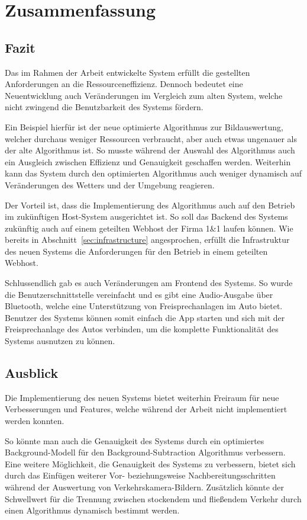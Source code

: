\chapter{Zusammenfassung}

\section{Fazit}
Das im Rahmen der Arbeit entwickelte System erfüllt die gestellten Anforderungen an die Ressourceneffizienz.
Dennoch bedeutet eine Neuentwicklung auch Veränderungen im Vergleich zum alten System, welche nicht zwingend die Benutzbarkeit des Systems fördern.

Ein Beispiel hierfür ist der neue optimierte Algorithmus zur Bildauswertung, welcher durchaus weniger Ressourcen verbraucht, aber auch etwas ungenauer als der alte Algorithmus ist.
So musste während der Auswahl des Algorithmus auch ein Ausgleich zwischen Effizienz und Genauigkeit geschaffen werden.
Weiterhin kann das System durch den optimierten Algorithmus auch weniger dynamisch auf Veränderungen des Wetters und der Umgebung reagieren.

Der Vorteil ist, dass die Implementierung des Algorithmus auch auf den Betrieb im zukünftigen Host-System ausgerichtet ist.
So soll das Backend des Systems zukünftig auch auf einem geteilten Webhost der Firma 1\&1 laufen können.
Wie bereits in Abschnitt~\ref{sec:infrastructure} angesprochen, erfüllt die Infrastruktur des neuen Systems die Anforderungen für den Betrieb in einem geteilten Webhost.

Schlussendlich gab es auch Veränderungen am Frontend des Systems.
So wurde die Benutzerschnittstelle vereinfacht und es gibt eine Audio-Ausgabe über Bluetooth, welche eine Unterstützung von Freisprechanlagen im Auto bietet.
Benutzer des Systems können somit einfach die App starten und sich mit der Freisprechanlage des Autos verbinden, um die komplette Funktionalität des Systems ausnutzen zu können.
\newpage

\section{Ausblick}
Die Implementierung des neuen Systems bietet weiterhin Freiraum für neue Verbesserungen und Features, welche während der Arbeit nicht implementiert werden konnten.

So könnte man auch die Genauigkeit des Systems durch ein optimiertes Background-Modell für den Background-Subtraction Algorithmus verbessern.
Eine weitere Möglichkeit, die Genauigkeit des Systems zu verbessern, bietet sich durch das Einfügen weiterer Vor- beziehungsweise Nachbereitungsschritten während der Auswertung von Verkehrskamera-Bildern.
Zusätzlich könnte der Schwellwert für die Trennung zwischen stockendem und fließendem Verkehr durch einen Algorithmus dynamisch bestimmt werden.


